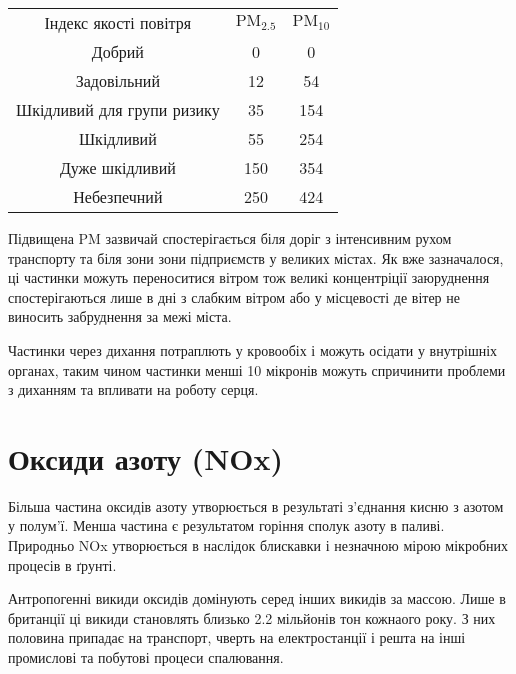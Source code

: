 \begin{center}
    \begin{tabular}{c c c}
        Індекс якості повітря & 
        $\mathrm{PM}_{2.5}$ & $\mathrm{PM}_{10}$ \\
        \cellcolor{green}
        Добрий & 0 & 0\\
        \cellcolor{yellow}
        Задовільний & 12 & 54\\
        \cellcolor{orange}
        Шкідливий для групи ризику & 35 & 154\\
        \cellcolor{red}
        Шкідливий & 55 & 254\\
        \cellcolor{Mahogany}
        Дуже шкідливий & 150 & 354\\
        \cellcolor{Sepia}
        Небезпечний & 250 & 424\\
    \end{tabular}
    
    \vspace{1cm}
\end{center}


Підвищена PM зазвичай спостерігається біля доріг з інтенсивним рухом транспорту та
біля зони зони підприємств у великих містах. Як вже зазначалося, ці частинки можуть 
переноситися вітром тож великі концентріції заюруднення спостерігаються лише в дні з 
слабким вітром або у місцевості де вітер не виносить забруднення за межі міста.

Частинки через дихання потраплють у кровообіх і можуть осідати у внутрішніх органах, 
таким чином частинки менші 10 мікронів можуть спричинити проблеми з диханням та 
впливати на роботу серця.\cite{noauthor_dusts_nodate}

\section{Оксиди азоту (NOx)}

Більша частина оксидів азоту утворюється в результаті з'єднання кисню з азотом у полум'ї. 
Менша частина є результатом горіння сполук азоту в паливі. Природньо NOx утворюється в наслідок 
блискавки і незначною мірою мікробних процесів в ґрунті.

Антропогенні викиди оксидів домінують серед інших викидів за массою. Лише в британції ці викиди 
становлять близько 2.2 мільйонів тон кожнаого року. З них половина припадає на транспорт, 
чверть на електростанції і решта на інші промислові та побутові процеси спалювання.\cite{noauthor_nitrogen_nodate}

